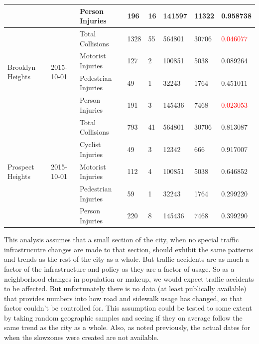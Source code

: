 \documentclass[10pt,journal,compsoc]{IEEEtran}
\begin{document}
\begin{table}[]
\begin{tabular}{|l|l|l|l|l|l|l|l|}
                                            &                             & Person Injuries     & 196       & 16       & 141597     & 11322     & 0.958738 \\ \hline
\multirow{4}{*}{Brooklyn Heights}           & \multirow{4}{*}{2015-10-01} & Total Collisions    & 1328      & 55       & 564801     & 30706     & \textcolor{red}{0.046077} \\ \cline{3-8} 
                                            &                             & Motorist Injuries   & 127       & 2        & 100851     & 5038      & 0.089264 \\ \cline{3-8} 
                                            &                             & Pedestrian Injuries & 49        & 1        & 32243      & 1764      & 0.451011 \\ \cline{3-8} 
                                            &                             & Person Injuries     & 191       & 3        & 145436     & 7468      & \textcolor{red}{0.023053} \\ \hline
\multirow{5}{*}{Prospect Heights}           & \multirow{5}{*}{2015-10-01} & Total Collisions    & 793       & 41       & 564801     & 30706     & 0.813087 \\ \cline{3-8} 
                                            &                             & Cyclist Injuries    & 49        & 3        & 12342      & 666       & 0.917007 \\ \cline{3-8} 
                                            &                             & Motorist Injuries   & 112       & 4        & 100851     & 5038      & 0.646852 \\ \cline{3-8} 
                                            &                             & Pedestrian Injuries & 59        & 1        & 32243      & 1764      & 0.299220 \\ \cline{3-8} 
                                            &                             & Person Injuries     & 220       & 8        & 145436     & 7468      & 0.399290 \\ \hline
\end{tabular}
\end{table}

This analysis assumes that a small section of the city, when no special traffic infrastrucutre changes are made to that section, should exhibit the same patterns and trends as the rest of the city as a whole.  But traffic accidents are as much a factor of the infrastructure and policy as they are a factor of usage.  So as a neighborhood changes in population or makeup, we would expect traffic accidents to be affected.  But unfortunately there is no data (at least publically available) that provides numbers into how road and sidewalk usage has changed, so that factor couldn't be controlled for.  This assumption could be tested to some extent by taking random geographic samples and seeing if they on average follow the same trend as the city as a whole.  Also, as noted previously, the actual dates for when the slowzones were created are not available.
\end{document}

